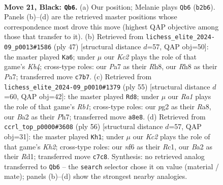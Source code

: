 \documentclass[11pt]{article}
\begin{document}
\clearpage

\begin{figure}[p]\centering
\begin{subfigure}{0.46\textwidth}\centering
\resizebox{\linewidth}{!}{%
\newchessgame
\chessboard[
  setfen={r6r/p1k2p1p/2p2N2/2Q5/3p4/3P4/bq3PPP/2R3K1 b - - 1 21},
  showmover=false,
  pgfstyle=straightmove, color=movearrow, markmove={b2-b6}
]}
\caption{}
\end{subfigure}\hfill
\begin{subfigure}{0.46\textwidth}\centering
\resizebox{\linewidth}{!}{%
\newchessgame
\chessboard[
  setfen={6rr/pp1R4/4p2p/1k1pQ3/3P2qP/8/PPP5/2KR4 b - - 0 24},
  showmover=false,
  pgfstyle=straightmove, color=movearrow, markmove={b5-a6}
]}
\caption{}
\end{subfigure}
\\[4pt]
\begin{subfigure}{0.46\textwidth}\centering
\resizebox{\linewidth}{!}{%
\newchessgame
\chessboard[
  setfen={rr5k/4q2p/3R1pp1/8/1p1QP3/5P2/P5PP/5R1K b - - 2 28},
  showmover=false,
  pgfstyle=straightmove, color=movearrow, markmove={b8-d8}
]}
\caption{}
\end{subfigure}\hfill
\begin{subfigure}{0.46\textwidth}\centering
\resizebox{\linewidth}{!}{%
\newchessgame
\chessboard[
  setfen={3r2k1/Q4p2/2p3p1/3P4/4p1p1/2P1P1P1/P4q1K/2RR4 w - - 0 29},
  showmover=false,
  pgfstyle=straightmove, color=movearrow, markmove={h2-h1}
]}
\caption{}
\end{subfigure}
\caption{\textbf{Move 21, Black: \texttt{Qb6}.} (a) Our position; Melanie plays \texttt{Qb6} (\texttt{b2b6}). Panels (b)--(d) are the retrieved master positions whose correspondence most drove this move (highest QAP objective among those that transfer to it). (b) Retrieved from \texttt{lichess\_elite\_2024-09\_p0013\#1586} (ply 47) [structural distance $d$=57, QAP obj=50]: the master played \texttt{Ka6}; under $\mu$ our \emph{Kc2} plays the role of that game's \emph{Kb4}; cross-type roles: our \emph{P}a7 as their \emph{R}h8, our \emph{R}h8 as their \emph{P}a7; transferred move \texttt{c7b7}. (c) Retrieved from \texttt{lichess\_elite\_2024-09\_p0010\#1379} (ply 55) [structural distance $d$=60, QAP obj=42]: the master played \texttt{Rd8}; under $\mu$ our \emph{Ra1} plays the role of that game's \emph{Rb1}; cross-type roles: our \emph{p}g2 as their \emph{R}a8, our \emph{B}a2 as their \emph{P}h7; transferred move \texttt{a8e8}. (d) Retrieved from \texttt{ccrl\_top\_p0000\#3608} (ply 56) [structural distance $d$=57, QAP obj=31]: the master played \texttt{Kh1}; under $\mu$ our \emph{Kc2} plays the role of that game's \emph{Kh2}; cross-type roles: our \emph{n}f6 as their \emph{R}c1, our \emph{B}a2 as their \emph{R}d1; transferred move \texttt{c7c8}. Synthesis: no retrieved analog transferred to \texttt{Qb6} -- the \texttt{search} selector chose it on value (material / mate); panels (b)--(d) show the strongest nearby analogies.}
\label{fig:thought-m41}
\end{figure}
\end{document}
